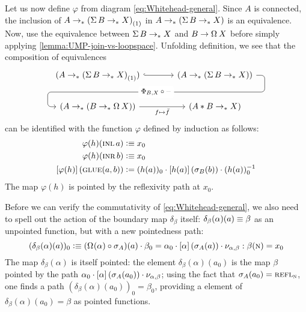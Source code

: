 \documentclass[english,a4paper]{lmcs}
\begin{document}
Let us now define $\varphi$ from diagram \eqref{eq:Whitehead-general}.
Since $A$ is connected, the inclusion of
$A \to_\ast {(\operatorname{\Sigma}B \to_\ast X)}_{\left(1\right)}$
in $A \to_\ast (\operatorname{\Sigma} B \to_\ast X)$ is an equivalence.
Now, use the equivalence between $\operatorname{\Sigma} B \to_\ast X$
and $B \to \loopspace\null X$ before
simply applying \cref{lemma:UMP-join-vs-loopspace}.
Unfolding definition, we see that the composition of
equivalences
\begin{equation}
  \begin{tikzcd}[column sep=large]
    (A \ptdto \conncomp{(\susp B \ptdto X)}{\wunit}) \rar[hookrightarrow]
    & (A \ptdto (\susp B \ptdto X)) \dlar[
      rounded corners,
      to path={
        (\tikztostart.east) -|
        ([xshift=1em, yshift=-2em]\tikztostart.east) -|
        node[near start, fill=white] {\footnotesize$\Phi_{B,X}\circ \blank$}
        ([xshift=-1em]\tikztotarget.west) --
        (\tikztotarget.west)
      }
    ]\\
    (A \ptdto (B \ptdto \loopspace{}X)) \rar["f \mapsto \bar f"']
    & (A*B \ptdto X)
  \end{tikzcd}
  \label{eq:def-varphi-no-smash}
\end{equation}
can be identified with the function $\varphi$ defined by induction as follows:
\begin{align}
  \varphi(h) (\mathop{\textsc{inl}} a) &\vcentcolon\equiv x_0 \\
  \varphi(h) (\mathop{\textsc{inr}} b) &\vcentcolon\equiv x_0 \\
  \left[{\varphi(h)}\right] (\operatorname{\textsc{glue}}(a,b))
                      &\vcentcolon= (h(a))_0 \cdot \left[{h(a)}\right](\sigma_B(b))
                        \cdot (h(a))_0^{-1}
\end{align}
The map $\varphi(h)$ is pointed by the reflexivity path at $x_0$.

Before we can verify the commutativity of \eqref{eq:Whitehead-general},
we also need to spell out the action of the boundary map $\delta_\beta$ itself:
$\delta_\beta(\alpha)(a) \equiv \beta$ as an unpointed function,
but with a new pointedness path:
\begin{equation}
  (\delta_\beta(\alpha)(a))_0 \defequi
  (\loopspace\null(\alpha)\circ\sigma_A)(a) \cdot \beta_0
  = \alpha_0 \cdot \ap{\alpha}(\sigma_A(a)) \cdot \miniast\alpha\beta
  : \beta(\north) = x_0
\end{equation}
The map $\delta_\beta(\alpha)$ is itself pointed: the element
$\delta_\beta(\alpha)(a_0)$ is the map $\beta$ pointed by the path
$\alpha_0\cdot \left[{\alpha}\right](\sigma_A(a_0)) \cdot \nu_{\alpha,\beta}$;
using the fact that $\sigma_A(a_0) = \mathop{{\textsc{refl}}_{\textsc{n}}}$, one finds a path
$(\delta_\beta(\alpha)(a_0))_0 = \beta_0$, providing a element of
$\delta_\beta(\alpha)(a_0) = \beta$ as pointed functions.
\end{document}
